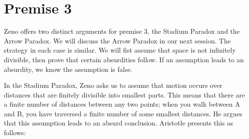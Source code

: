 \documentclass[oneside]{article}
\begin{document}
\section*{Premise 3}\label{premise-3}

Zeno offers two distinct arguments for premise 3, the Stadium Paradox and the Arrow Paradox. We will discuss the Arrow Paradox in our next session.  The strategy in each case is similar. We will fist assume that space is not infinitely divisible, then prove that certain absurdities follow. If an assumption leads to an absurdity, we know the assumption is false. 





In the Stadium Paradox, Zeno asks us to assume that motion occurs over distances that are finitely divisible into smallest parts. This means that there are a finite number of distances between any two points; when you walk between A and B, you have traversed a finite number of some smallest distances. He argues that this assumption leads to an absurd conclusion. Aristotle presents this as follows: 
\end{document}

